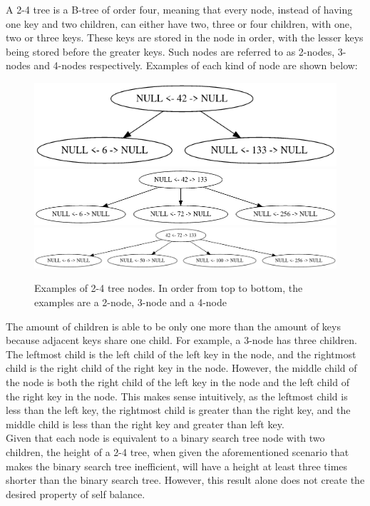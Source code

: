 \documentclass{article}
\begin{document}
\noindent
A 2-4 tree is a B-tree of order four, meaning that every node, instead of having one key and two children, can either have two, three or four children, with one, two or three keys. These keys are stored in the node in order, with the lesser keys being stored before the greater keys. Such nodes are referred to as 2-nodes, 3-nodes and 4-nodes respectively. Examples of each kind of node are shown below:
\\

\begin{figure}[ht]
    \centering
    \includegraphics[width = 12cm]{2node.png}
    \includegraphics[width = 12cm]{3node.png}
    \includegraphics[width = 12cm]{4node.png}
    \caption{Examples of 2-4 tree nodes. In order from top to bottom, the examples are a 2-node, 3-node and a 4-node }
    
\end{figure}

\noindent
The amount of children is able to be only one more than the amount of keys because adjacent keys share one child. For example, a 3-node has three children. The leftmost child is the left child of the left key in the node, and the rightmost child is the right child of the right key in the node. However, the middle child of the node is both the right child of the left key in the node and the left child of the right key in the node. This makes sense intuitively, as the leftmost child is less than the left key, the rightmost child is greater than the right key, and the middle child is less than the right key and greater than left key.
\\

\noindent
Given that each node is equivalent to a binary search tree node with two children, the height of a 2-4 tree, when given the aforementioned scenario that makes the binary search tree inefficient, will have a height at least three times shorter than the binary search tree. However, this result alone does not create the desired property of self balance.
\\
\end{document}
